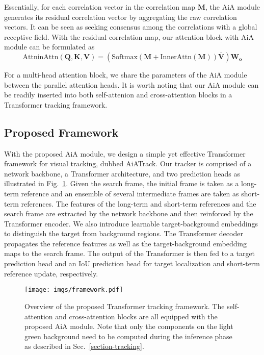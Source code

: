 Essentially, for each correlation vector in the correlation map $\mathbf{M}$, the AiA module generates its residual correlation vector by aggregating the raw correlation vectors. It can be seen as seeking consensus among the correlations with a global receptive field. With the residual correlation map, our attention block with AiA module can be formulated as
\begin{equation}
    \text{AttninAttn}(\mathbf{Q}, \mathbf{K}, \mathbf{V}) = (\text{Softmax}(\mathbf{M} + \text{InnerAttn}(\mathbf{M}))\mathbf{\bar{V}})\mathbf{W_{o}}
\end{equation}

For a multi-head attention block, we share the parameters of the AiA module between the parallel attention heads. It is worth noting that our AiA module can be readily inserted into both self-attenion and cross-attention blocks in a Transformer tracking framework.

\subsection{Proposed Framework}\label{section-network}
With the proposed AiA module, we design a simple yet effective Transformer framework for visual tracking, dubbed AiATrack. Our tracker is comprised of a network backbone, a Transformer architecture, and two prediction heads as illustrated in Fig.~\ref{figure-framework}. Given the search frame, the initial frame is taken as a long-term reference and an ensemble of several intermediate frames are taken as short-term references. The features of the long-term and short-term references and the search frame are extracted by the network backbone and then reinforced by the Transformer encoder. We also introduce learnable target-background embeddings to distinguish the target from background regions. The Transformer decoder propagates the reference features as well as the target-background embedding maps to the search frame. The output of the Transformer is then fed to a target prediction head and an IoU prediction head for target localization and short-term reference update, respectively.

\begin{figure}[t]
\centering
\texttt{[image: imgs/framework.pdf]}
\caption{Overview of the proposed Transformer tracking framework. The self-attention and cross-attention blocks are all equipped with the proposed AiA module. Note that only the components on the light green background need to be computed during the inference phase as described in Sec.~\ref{section-tracking}.}
\label{figure-framework}
\end{figure}


